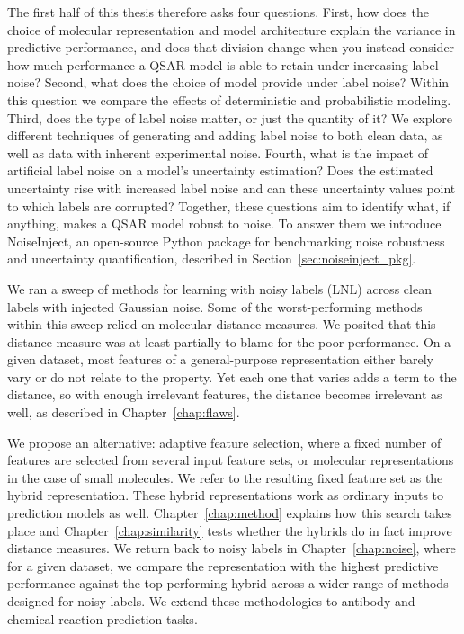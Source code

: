 The first half of this thesis therefore asks four questions.\label{sec:intro:questions} First, how does the choice of molecular representation and model architecture explain the variance in predictive performance, and does that division change when you instead consider how much performance a QSAR model is able to retain under increasing label noise? Second, what does the choice of model provide under label noise? Within this question we compare the effects of deterministic and probabilistic modeling. Third, does the type of label noise matter, or just the quantity of it? We explore different techniques of generating and adding label noise to both clean data, as well as data with inherent experimental noise. Fourth, what is the impact of artificial label noise on a model's uncertainty estimation? Does the estimated uncertainty rise with increased label noise and can these uncertainty values point to which labels are corrupted? Together, these questions aim to identify what, if anything, makes a QSAR model robust to noise. To answer them we introduce NoiseInject, an open-source Python package for benchmarking noise robustness and uncertainty quantification, described in Section~\ref{sec:noiseinject_pkg}.

We ran a sweep of methods for learning with noisy labels (LNL) across clean labels with injected Gaussian noise. Some of the worst-performing methods within this sweep relied on molecular distance measures. We posited that this distance measure was at least partially to blame for the poor performance. On a given dataset, most features of a general-purpose representation either barely vary or do not relate to the property. Yet each one that varies adds a term to the distance, so with enough irrelevant features, the distance becomes irrelevant as well, as described in Chapter~\ref{chap:flaws}. 

We propose an alternative: adaptive feature selection, where a fixed number of features are selected from several input feature sets, or molecular representations in the case of small molecules. We refer to the resulting fixed feature set as the hybrid representation. These hybrid representations work as ordinary inputs to prediction models as well. Chapter~\ref{chap:method} explains how this search takes place and Chapter~\ref{chap:similarity} tests whether the hybrids do in fact improve distance measures. We return back to noisy labels in Chapter~\ref{chap:noise}, where for a given dataset, we compare the representation with the highest predictive performance against the top-performing hybrid across a wider range of methods designed for noisy labels. We extend these methodologies to antibody and chemical reaction prediction tasks. 

